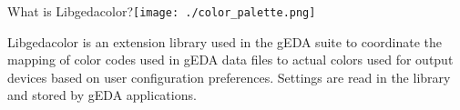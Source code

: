  What is Libgedacolor?\texttt{[image: ./color\_palette.png]}

  Libgedacolor is an extension library used in the gEDA suite to coordinate
  the mapping of color codes used in gEDA data files to actual colors used
  for output devices based on user configuration preferences. Settings
  are read in the library and stored by gEDA applications.

